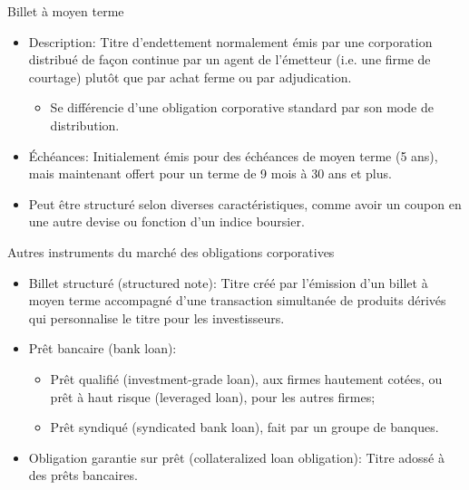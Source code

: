 \documentclass{beamer}
\begin{document}
\begin{frame}{Billet à moyen terme}
\begin{itemize}
\item Description: Titre d’endettement normalement émis par une corporation distribué de façon continue par un agent de l’émetteur (i.e. une firme de courtage) plutôt que par achat ferme ou par adjudication.
\begin{itemize}
\item Se différencie d’une obligation corporative standard par son mode de distribution. 
\end{itemize} 
\item Échéances: Initialement émis pour des échéances de moyen terme (5 ans), mais maintenant offert pour un terme de 9 mois à 30 ans et plus.
\item Peut être structuré selon diverses caractéristiques, comme avoir un coupon en une autre devise ou fonction d’un indice boursier. 
\end{itemize}
\end{frame}

\begin{frame}{Autres instruments du marché des obligations corporatives}
\begin{itemize}
\item Billet structuré (structured note): Titre créé par l’émission d’un billet à moyen terme accompagné d’une transaction simultanée de produits dérivés qui personnalise le titre pour les investisseurs. 
\item Prêt bancaire (bank loan): 
\begin{itemize}
\item Prêt qualifié (investment-grade loan), aux firmes hautement cotées, ou prêt à haut risque (leveraged loan), pour les autres firmes;
\item Prêt syndiqué (syndicated bank loan), fait par un groupe de banques. 
\end{itemize}
\item Obligation garantie sur prêt (collateralized loan obligation): Titre adossé à des prêts bancaires. 
\end{itemize}
\end{frame}
\end{document}
